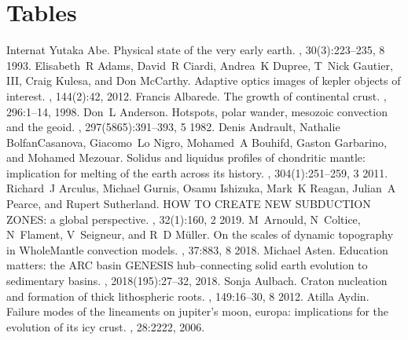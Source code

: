 \documentclass[letterpaper,10pt,english]{jupyterBook}
\begin{document}
\chapter{Tables}
\label{\detokenize{appendices/tables/main:tables}}\label{\detokenize{appendices/tables/main::doc}}
\begin{sphinxthebibliography}{Internat}
\sphinxAtStartPar
Yutaka Abe. Physical state of the very early earth. , 30(3):223–235, 8 1993.
\sphinxAtStartPar
Elisabeth R Adams, David R Ciardi, Andrea K Dupree, T Nick Gautier, III, Craig Kulesa, and Don McCarthy. Adaptive optics images of kepler objects of interest. , 144(2):42, 2012.
\sphinxAtStartPar
Francis Albarede. The growth of continental crust. , 296:1–14, 1998.
\sphinxAtStartPar
Don L Anderson. Hotspots, polar wander, mesozoic convection and the geoid. , 297(5865):391–393, 5 1982.
\sphinxAtStartPar
Denis Andrault, Nathalie Bolfan\sphinxhyphen{}Casanova, Giacomo Lo Nigro, Mohamed A Bouhifd, Gaston Garbarino, and Mohamed Mezouar. Solidus and liquidus profiles of chondritic mantle: implication for melting of the earth across its history. , 304(1):251–259, 3 2011.
\sphinxAtStartPar
Richard J Arculus, Michael Gurnis, Osamu Ishizuka, Mark K Reagan, Julian A Pearce, and Rupert Sutherland. HOW TO CREATE NEW SUBDUCTION ZONES: a global perspective. , 32(1):160, 2 2019.
\sphinxAtStartPar
M Arnould, N Coltice, N Flament, V Seigneur, and R D Müller. On the scales of dynamic topography in Whole\sphinxhyphen{}Mantle convection models. , 37:883, 8 2018.
\sphinxAtStartPar
Michael Asten. Education matters: the ARC basin GENESIS hub–connecting solid earth evolution to sedimentary basins. , 2018(195):27–32, 2018.
\sphinxAtStartPar
Sonja Aulbach. Craton nucleation and formation of thick lithospheric roots. , 149:16–30, 8 2012.
\sphinxAtStartPar
Atilla Aydin. Failure modes of the lineaments on jupiter's moon, europa: implications for the evolution of its icy crust. , 28:2222, 2006.

\end{sphinxthebibliography}
\end{document}
